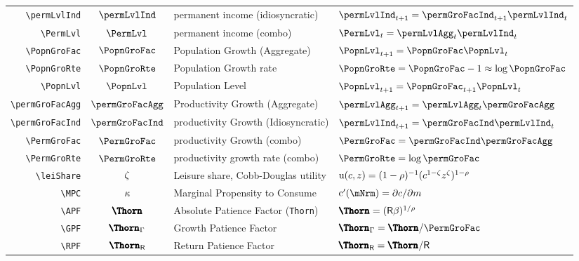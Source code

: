 \documentclass[12pt]{\econtex}
\begin{document}
\begin{table}[ht]
\begin{tabular}{|>{\ttfamily}rcll|}
    \\ \verb|\permLvlInd|  & $\permLvlInd$ & permanent income (idiosyncratic) & $\permLvlInd_{t+1} = \permGroFacInd_{t+1}\permLvlInd_{t} $
    \\ \verb|\PermLvl|  & $\PermLvl$ & permanent income (combo) & $\PermLvl_{t} = \permLvlAgg_{t}\permLvlInd_{t} $
    \\ \verb|\PopnGroFac|   & $\PopnGroFac$ & Population Growth (Aggregate) & $\PopnLvl_{t+1} = \PopnGroFac \PopnLvl_{t}$
    \\ \verb|\PopnGroRte|   & $\PopnGroRte$ & Population Growth rate & $\PopnGroRte = \PopnGroFac - 1 \approx \log \PopnGroFac$
    \\ \verb|\PopnLvl|   & $\PopnLvl$ & Population Level & $\PopnLvl_{t+1} = \PopnGroFac_{t+1} \PopnLvl_{t}$
    \\ \verb|\permGroFacAgg|  & $\permGroFacAgg$ & Productivity Growth (Aggregate) & $\permLvlAgg_{t+1}=\permLvlAgg_{t} \permGroFacAgg$
    \\ \verb|\permGroFacInd|  & $\permGroFacInd$ & productivity Growth (Idiosyncratic) & $\permLvlInd_{t+1} = \permGroFacInd \permLvlInd_{t}$
    \\ \verb|\PermGroFac|  & $\PermGroFac$ & productivity Growth (combo) & $\PermGroFac = \permGroFacInd \permGroFacAgg$
    \\ \verb|\PermGroRte|  & $\PermGroRte$ & productivity growth rate (combo) & $\PermGroRte = \log \permGroFac$
    \\ \verb|\leiShare|  & $\zeta$ & Leisure share, Cobb-Douglas utility & ${\mathrm{u}}(c,z)=(1-\rho)^{-1}(c^{1-\zeta}z^{\zeta})^{1-\rho}$
    \\ \verb|\MPC|  & $\kappa$ & Marginal Propensity to Consume & $\cFunc^{\prime}(\mNrm)=\partial c/\partial m$
    \\ \verb|\APF|  & $\Pat$ & Absolute Patience Factor (\texttt{Thorn}) & $\Pat = (\Rfree \DiscFac)^{1/\CRRA} $
    \\ \verb|\GPF| & $\PatPGro$ & Growth Patience Factor & $\PatPGro = \Pat/\PermGroFac $
    \\ \verb|\RPF| & $\PatR$ & Return Patience Factor & $\PatR = \Pat/\Rfree $ 

\end{tabular}
\end{table}
\end{document}
